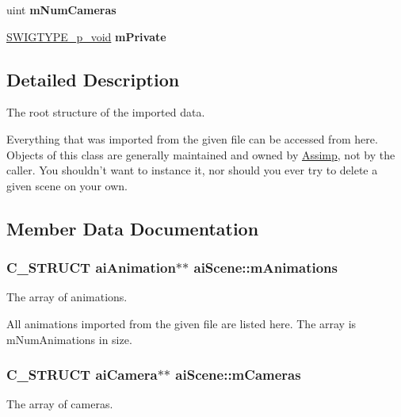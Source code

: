 \begin{DoxyCompactItemize}
\item 
\hypertarget{structai_scene_a31c99e22ab1a5de547a113a57d4e350a}{uint {\bfseries m\+Num\+Cameras}}\label{structai_scene_a31c99e22ab1a5de547a113a57d4e350a}

\item 
\hypertarget{structai_scene_acb2a8ace1f97f633765018b2aa0ee726}{\hyperlink{class_s_w_i_g_t_y_p_e__p__void}{S\+W\+I\+G\+T\+Y\+P\+E\+\_\+p\+\_\+void} {\bfseries m\+Private}}\label{structai_scene_acb2a8ace1f97f633765018b2aa0ee726}

\end{DoxyCompactItemize}


\subsection{Detailed Description}
The root structure of the imported data.

Everything that was imported from the given file can be accessed from here. Objects of this class are generally maintained and owned by \hyperlink{class_assimp}{Assimp}, not by the caller. You shouldn't want to instance it, nor should you ever try to delete a given scene on your own. 

\subsection{Member Data Documentation}
\hypertarget{structai_scene_ab76fb8f38c2e7365ccce42d565b62b25}{
\subsubsection[{m\+Animations}]{\setlength{\rightskip}{0pt plus 5cm}C\+\_\+\+S\+T\+R\+U\+C\+T {\bf ai\+Animation}$\ast$$\ast$ ai\+Scene\+::m\+Animations}}\label{structai_scene_ab76fb8f38c2e7365ccce42d565b62b25}
The array of animations.

All animations imported from the given file are listed here. The array is m\+Num\+Animations in size. \hypertarget{structai_scene_a71e7d204d96969ca4f5a931f4d636f1e}{
\subsubsection[{m\+Cameras}]{\setlength{\rightskip}{0pt plus 5cm}C\+\_\+\+S\+T\+R\+U\+C\+T {\bf ai\+Camera}$\ast$$\ast$ ai\+Scene\+::m\+Cameras}}\label{structai_scene_a71e7d204d96969ca4f5a931f4d636f1e}
The array of cameras.


